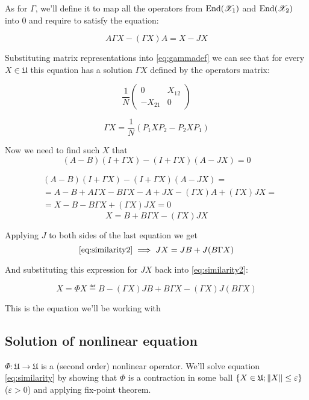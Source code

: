 \documentclass{article}
\begin{document}
As for $\Gamma$, we'll define it to map
all the operators from $\mathrm{End}({\mathscr X_1})$ and $\mathrm{End}({\mathscr X_2})$ into $0$
and require to satisfy the equation:

\begin{equation}
\label{eq:gammadef}
    A\Gamma X - (\Gamma X) A = X - JX
\end{equation}

Substituting matrix representations into \eqref{eq:gammadef} we can see
that for every $X \in \mathfrak U$ this equation has a solution $\Gamma X$
defined by the operators matrix:

$$
\frac{1}{N}
\begin{pmatrix}
    0       & X_{12} \\
    -X_{21} & 0
\end{pmatrix}
$$

$$\Gamma X = \frac{1}{N} (P_1 X P_2 - P_2 X P_1)$$

Now we need to find such $X$ that
\begin{equation}\label{eq:similarity1}
    (A - B)(I + \Gamma X) - (I + \Gamma X)(A - JX) = 0
\end{equation}

$$\begin{aligned}
    & (A - B)(I + \Gamma X) - (I + \Gamma X)(A - JX) = \\
    & = A - B + A\Gamma X - B\Gamma X - A + JX - (\Gamma X) A + (\Gamma X) JX = \\
    & = X - B - B\Gamma X + (\Gamma X) JX = 0
\end{aligned}$$
\begin{equation}\label{eq:similarity2}
    X = B + B\Gamma X - (\Gamma X) JX
\end{equation}

Applying $J$ to both sides of the last equation we get
$$\eqref{eq:similarity2} \implies
JX = JB + J(B\Gamma X)$$

And substituting this expression for $JX$ back into \eqref{eq:similarity2}:

\begin{equation}\label{eq:similarity}
    X = \Phi X \eqdef B - (\Gamma X) JB + B\Gamma X - (\Gamma X) J(B\Gamma X)
\end{equation}

This is the equation we'll be working with

\subsection{Solution of nonlinear equation}
$\Phi:\mathfrak U\to\mathfrak U$ is a (second order) nonlinear operator.
We'll solve equation \eqref{eq:similarity}
by showing that $\Phi$ is a contraction in some ball $\{ X\in \mathfrak U; \left\|{X}\right\| \leq \varepsilon \}$ ($\varepsilon>0$)
and applying fix-point theorem.
\end{document}
